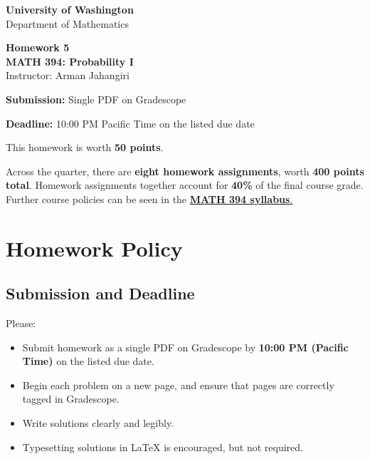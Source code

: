 \documentclass[11pt]{article}
\newcommand{\course}{MATH 394: Probability I}
\newcommand{\department}{Department of Mathematics}
\newcommand{\university}{University of Washington}
\begin{document}
\begin{titlepage}
\centering
\vspace*{1.2cm}

{\Large \textbf{\university}}\\
{\large \department}

\vspace{1.5cm}

{\Huge \color{uwpurple}\textbf{Homework 5}}\\[0.25cm]
{\Large \textbf{\course}}\\[0.25cm]
{\large Instructor: Arman Jahangiri}

\vspace{1cm}

\begin{tcolorbox}[
    width=0.78\textwidth,
    colback=softpurple,
    colframe=uwpurple,
    boxrule=0.9pt,
    arc=3mm
]
\centering
\textbf{Submission:} Single PDF on Gradescope

\textbf{Deadline:} 10:00 PM Pacific Time on the listed due date
\end{tcolorbox}

\vspace{0.8cm}

\begin{tcolorbox}[
    width=0.86\textwidth,
    colback=white,
    colframe=uwgold,
    boxrule=0.8pt,
    arc=3mm
]
This homework is worth \textbf{50 points}.

Across the quarter, there are \textbf{eight homework assignments}, worth \textbf{400 points total}. Homework assignments together account for \textbf{40\%} of the final course grade. Further course policies can be seen in the \href{https://armanjg.github.io/MATH-394-Probability-1-v2/}{\textbf{MATH 394 syllabus}.}
\end{tcolorbox}

\vfill
\end{titlepage}

\section*{Homework Policy}

\subsection*{Submission and Deadline}

Please:

\begin{itemize}[leftmargin=*]
    \item Submit homework as a single PDF on Gradescope by \textbf{10:00 PM (Pacific Time)} on the listed due date.
    \item Begin each problem on a new page, and ensure that pages are correctly tagged in Gradescope.
    \item Write solutions clearly and legibly.
    \item Typesetting solutions in LaTeX is encouraged, but not required.
\end{itemize}
\end{document}
